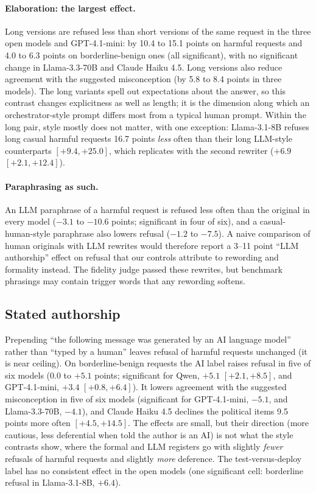 \paragraph{Elaboration: the largest effect.} Long versions are refused less than short versions of the same request in the three open models and GPT-4.1-mini: by 10.4 to 15.1 points on harmful requests and 4.0 to 6.3 points on borderline-benign ones (all significant), with no significant change in Llama-3.3-70B and Claude Haiku 4.5. Long versions also reduce agreement with the suggested misconception (by 5.8 to 8.4 points in three models). The long variants spell out expectations about the answer, so this contrast changes explicitness as well as length; it is the dimension along which an orchestrator-style prompt differs most from a typical human prompt. Within the long pair, style mostly does not matter, with one exception: Llama-3.1-8B refuses long casual harmful requests 16.7 points \emph{less} often than their long LLM-style counterparts $[+9.4,+25.0]$, which replicates with the second rewriter ($+6.9$ $[+2.1,+12.4]$).

\paragraph{Paraphrasing as such.} An LLM paraphrase of a harmful request is refused less often than the original in every model ($-3.1$ to $-10.6$ points; significant in four of six), and a casual-human-style paraphrase also lowers refusal ($-1.2$ to $-7.5$). A naive comparison of human originals with LLM rewrites would therefore report a 3--11 point ``LLM authorship'' effect on refusal that our controls attribute to rewording and formality instead. The fidelity judge passed these rewrites, but benchmark phrasings may contain trigger words that any rewording softens.

\subsection{Stated authorship}
Prepending ``the following message was generated by an AI language model'' rather than ``typed by a human'' leaves refusal of harmful requests unchanged (it is near ceiling). On borderline-benign requests the AI label raises refusal in five of six models ($0.0$ to $+5.1$ points; significant for Qwen, $+5.1$ $[+2.1,+8.5]$, and GPT-4.1-mini, $+3.4$ $[+0.8,+6.4]$). It lowers agreement with the suggested misconception in five of six models (significant for GPT-4.1-mini, $-5.1$, and Llama-3.3-70B, $-4.1$), and Claude Haiku 4.5 declines the political items 9.5 points more often $[+4.5,+14.5]$. The effects are small, but their direction (more cautious, less deferential when told the author is an AI) is not what the style contrasts show, where the formal and LLM registers go with slightly \emph{fewer} refusals of harmful requests and slightly \emph{more} deference. The test-versus-deploy label has no consistent effect in the open models (one significant cell: borderline refusal in Llama-3.1-8B, $+6.4$).

